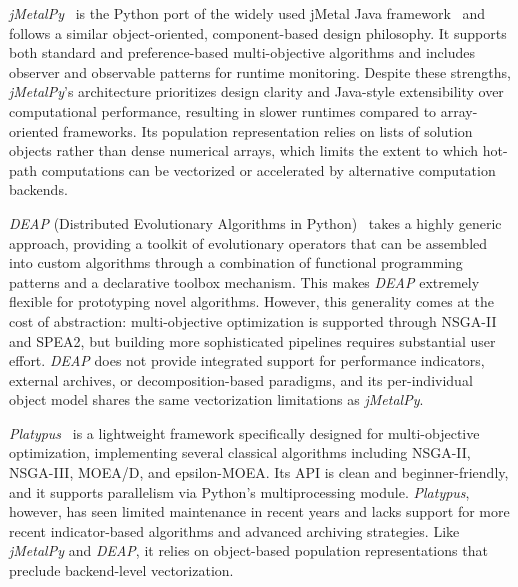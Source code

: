 \documentclass[journal]{IEEEtran}
\begin{document}
\textit{jMetalPy}~\cite{BNG+19} is the Python port of the widely used jMetal Java framework~\cite{DN11} and follows a similar object-oriented, component-based design philosophy. It supports both standard and preference-based multi-objective algorithms and includes observer and observable patterns for runtime monitoring. Despite these strengths, \textit{jMetalPy}'s architecture prioritizes design clarity and Java-style extensibility over computational performance, resulting in slower runtimes compared to array-oriented frameworks. Its population representation relies on lists of solution objects rather than dense numerical arrays, which limits the extent to which hot-path computations can be vectorized or accelerated by alternative computation backends.

\textit{DEAP} (Distributed Evolutionary Algorithms in Python)~\cite{FDG+12} takes a highly generic approach, providing a toolkit of evolutionary operators that can be assembled into custom algorithms through a combination of functional programming patterns and a declarative toolbox mechanism. This makes \textit{DEAP} extremely flexible for prototyping novel algorithms. However, this generality comes at the cost of abstraction: multi-objective optimization is supported through NSGA-II and SPEA2, but building more sophisticated pipelines requires substantial user effort. \textit{DEAP} does not provide integrated support for performance indicators, external archives, or decomposition-based paradigms, and its per-individual object model shares the same vectorization limitations as \textit{jMetalPy}.

\textit{Platypus}~\cite{hadka15} is a lightweight framework specifically designed for multi-objective optimization, implementing several classical algorithms including NSGA-II, NSGA-III, MOEA/D, and epsilon-MOEA. Its API is clean and beginner-friendly, and it supports parallelism via Python's multiprocessing module. \textit{Platypus}, however, has seen limited maintenance in recent years and lacks support for more recent indicator-based algorithms and advanced archiving strategies. Like \textit{jMetalPy} and \textit{DEAP}, it relies on object-based population representations that preclude backend-level vectorization.
\end{document}
